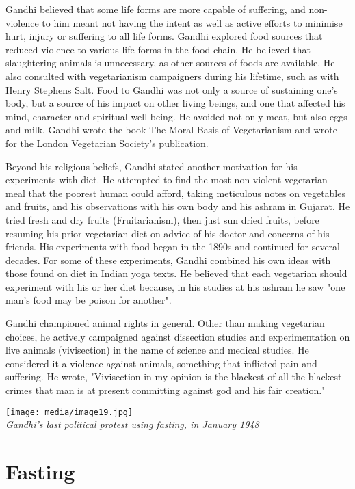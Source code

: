 Gandhi believed that some life forms are more capable of suffering, and
non-violence to him meant not having the intent as well as active
efforts to minimise hurt, injury or suffering to all life forms. Gandhi
explored food sources that reduced violence to various life forms in the
food chain. He believed that slaughtering animals is unnecessary, as
other sources of foods are available. He also consulted with
vegetarianism campaigners during his lifetime, such as with Henry
Stephens Salt. Food to Gandhi was not only a source of sustaining one's
body, but a source of his impact on other living beings, and one that
affected his mind, character and spiritual well being. He avoided not
only meat, but also eggs and milk. Gandhi wrote the book The Moral Basis
of Vegetarianism and wrote for the London Vegetarian Society's
publication.

Beyond his religious beliefs, Gandhi stated another motivation for his
experiments with diet. He attempted to find the most non-violent
vegetarian meal that the poorest human could afford, taking meticulous
notes on vegetables and fruits, and his observations with his own body
and his ashram in Gujarat. He tried fresh and dry fruits
(Fruitarianism), then just sun dried fruits, before resuming his prior
vegetarian diet on advice of his doctor and concerns of his friends. His
experiments with food began in the 1890s and continued for several
decades. For some of these experiments, Gandhi combined his own ideas
with those found on diet in Indian yoga texts. He believed that each
vegetarian should experiment with his or her diet because, in his
studies at his ashram he saw "one man's food may be poison for another".

Gandhi championed animal rights in general. Other than making vegetarian
choices, he actively campaigned against dissection studies and
experimentation on live animals (vivisection) in the name of science and
medical studies. He considered it a violence against animals, something
that inflicted pain and suffering. He wrote, "Vivisection in my opinion
is the blackest of all the blackest crimes that man is at present
committing against god and his fair creation."

\texttt{[image: media/image19.jpg]}\\
\emph{Gandhi's last political protest using fasting, in January 1948}

\section{Fasting}\label{fasting}

